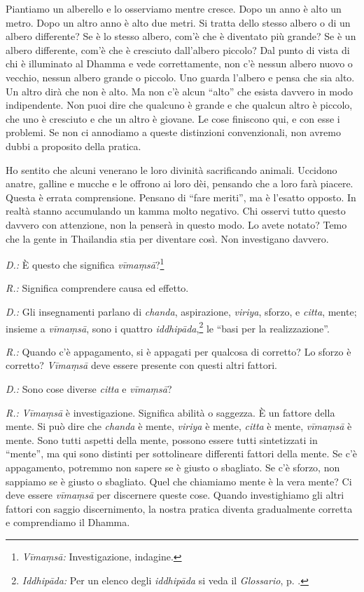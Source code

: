 Piantiamo un alberello e lo osserviamo mentre cresce. Dopo un anno è
alto un metro. Dopo un altro anno è alto due metri. Si tratta dello
stesso albero o di un albero differente? Se è lo stesso albero, com'è
che è diventato più grande? Se è un albero differente, com'è che è
cresciuto dall'albero piccolo? Dal punto di vista di chi è illuminato al
Dhamma e vede correttamente, non c'è nessun albero nuovo o vecchio,
nessun albero grande o piccolo. Uno guarda l'albero e pensa che sia
alto. Un altro dirà che non è alto. Ma non c'è alcun ``alto'' che esista
davvero in modo indipendente. Non puoi dire che qualcuno è grande e che
qualcun altro è piccolo, che uno è cresciuto e che un altro è giovane.
Le cose finiscono qui, e con esse i problemi. Se non ci annodiamo a
queste distinzioni convenzionali, non avremo dubbi a proposito della
pratica.

Ho sentito che alcuni venerano le loro divinità sacrificando animali.
Uccidono anatre, galline e mucche e le offrono ai loro dèi, pensando che
a loro farà piacere. Questa è errata comprensione. Pensano di ``fare
meriti'', ma è l'esatto opposto. In realtà stanno accumulando un
kamma molto negativo. Chi osservi tutto questo davvero con
attenzione, non la penserà in questo modo. Lo avete notato? Temo che la
gente in Thailandia stia per diventare così. Non investigano davvero.

\emph{D.:} È questo che significa \emph{vīmaṃsā}?\footnote{\emph{Vīmaṃsā:}
  Investigazione, indagine.}

\emph{R.:} Significa comprendere causa ed effetto.

\emph{D.:} Gli insegnamenti parlano di \emph{chanda}, aspirazione,
\emph{viriya}, sforzo, e \emph{citta}, mente; insieme a \emph{vīmaṃsā},
sono i quattro \emph{iddhipāda},\footnote{\emph{Iddhipāda:} Per un
  elenco degli \emph{iddhipāda} si veda il \emph{Glossario}, p. \pageref{glossary-iddhipada}.} le ``basi
per la realizzazione''.

\emph{R.:} Quando c'è appagamento, si è appagati per qualcosa di corretto? Lo
sforzo è corretto? \emph{Vīmaṃsā} deve essere presente con questi altri
fattori.

\emph{D.:} Sono cose diverse \emph{citta} e \emph{vīmaṃsā}?

\emph{R.:} \emph{Vīmaṃsā} è investigazione. Significa abilità o saggezza. È un
fattore della mente. Si può dire che \emph{chanda} è mente,
\emph{viriya} è mente, \emph{citta} è mente, \emph{vīmaṃsā} è mente.
Sono tutti aspetti della mente, possono essere tutti sintetizzati in
``mente'', ma qui sono distinti per sottolineare differenti fattori
della mente. Se c'è appagamento, potremmo non sapere se è giusto o
sbagliato. Se c'è sforzo, non sappiamo se è giusto o sbagliato. Quel che
chiamiamo mente è la vera mente? Ci deve essere \emph{vīmaṃsā} per
discernere queste cose. Quando investighiamo gli altri fattori con
saggio discernimento, la nostra pratica diventa gradualmente corretta e
comprendiamo il Dhamma.

